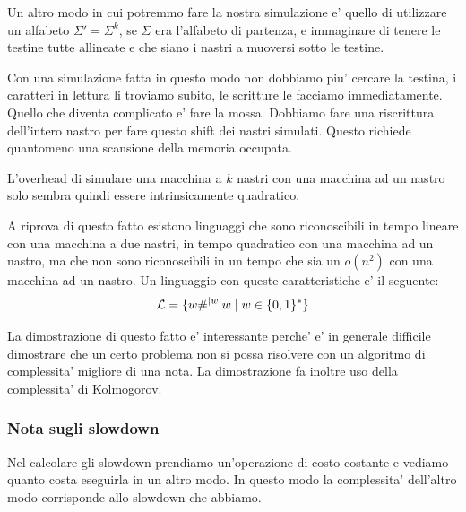 Un altro modo in cui potremmo fare la nostra simulazione e' quello di utilizzare un alfabeto
$\Sigma' = \Sigma^{k}$, se $\Sigma$ era l'alfabeto di partenza, e immaginare di tenere le testine
tutte allineate e che siano i nastri a muoversi sotto le testine.

Con una simulazione fatta in questo modo non dobbiamo piu' cercare la testina, i caratteri in
lettura li troviamo subito, le scritture le facciamo immediatamente. Quello che diventa complicato
e' fare la mossa. Dobbiamo fare una riscrittura dell'intero nastro per fare questo shift dei nastri
simulati. Questo richiede quantomeno una scansione della memoria occupata.

%

L'overhead di simulare una macchina a $k$ nastri con una macchina ad un nastro solo sembra quindi
essere intrinsicamente quadratico.



A riprova di questo fatto esistono linguaggi che sono riconoscibili in tempo lineare con una
macchina a due nastri, in tempo quadratico con una macchina ad un nastro, ma che non sono
riconoscibili in un tempo che sia un $o(n^{2})$ con una macchina ad un nastro. Un linguaggio con
queste caratteristiche e' il seguente:
\begin{equation*}
    \mathcal{L} = \{w\#^{|w|}w \mid w \in \{0,1\}^{*}\}
\end{equation*}

La dimostrazione di questo fatto e' interessante perche' e' in generale difficile dimostrare che un
certo problema non si possa risolvere con un algoritmo di complessita' migliore di una nota. La
dimostrazione fa inoltre uso della complessita' di Kolmogorov.

\subsubsection{Nota sugli slowdown}

Nel calcolare gli slowdown prendiamo un'operazione di costo costante e vediamo quanto costa
eseguirla in un altro modo. In questo modo la complessita' dell'altro modo corrisponde allo slowdown
che abbiamo.

